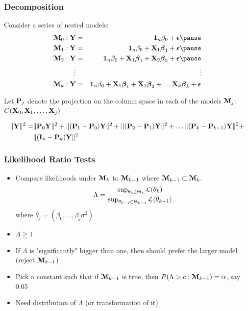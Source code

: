 \documentclass[handout]{beamer}
\begin{document}
\begin{frame}
  \frametitle{Decomposition}
  Consider a series of nested models: \pause
  \begin{eqnarray*}
    \M_0: \Y & = & \one_n \beta_0 + \eps   \pause\\
\M_1: \Y & = & \one_n \beta_0 + \X_1 \b_1 + \eps  \pause \\
\M_2: \Y & = & \one_n \beta_0 + \X_1 \b_1 + \X_2 \b_2 + \eps   \pause\\
\vdots & & \vdots \\
\M_k: \Y & = & \one_n \beta_0 + \X_1 \b_1 + \X_2 \b_2 + \ldots \X_k \b_k + \eps
  \end{eqnarray*} \pause

Let $\P_j$ denote the projection on the column space in each of the
models $\M_j$: $C(\X_0, \X_1, \ldots, \X_j)$ \pause
\begin{small}
  \begin{align*}
\| \Y \|^2 =&  \| \P_0 \Y\|^2 + \| (\P_1 - \P_0) \Y \|^2 + \|(\P_2
- \P_1)\Y\|^2 + \ldots \| (\P_k - \P_{k-1})\Y \|^2 + \\
& \|(\I_n -
\P_k)\Y\|^2
 \end{align*}
\end{small}

\end{frame}

\begin{frame} \frametitle{Likelihood Ratio Tests}

\begin{itemize}
  \item Compare likelihoods under $\M_{k}$ to $\M_{k-1}$ where $\M_{k-1} \subset \M_{k}$.
  $$\Lambda = \frac { \sup_{\theta_{k} \in \Theta_{k}} \cL(\theta_{k})}  { \sup_{\theta_{k-1} \in \Theta_{k-1}} \cL(\theta_{k-1})}$$
where  $\theta_j = (\beta_0, \ldots, \beta_j \sigma^2)$
\item  $\Lambda \ge 1$
\item If $\Lambda$ is "significantly" bigger than one, then should prefer the larger model (reject $\M_{k-1}$)
\item Pick a constant such that if  $\M_{k-1}$ is true, then $P(\Lambda > c \mid \M_{k-1}) = \alpha$, say $0.05$
\item Need distribution of $\Lambda$ (or transformation of it)

\end{itemize}



\end{frame}
\end{document}
